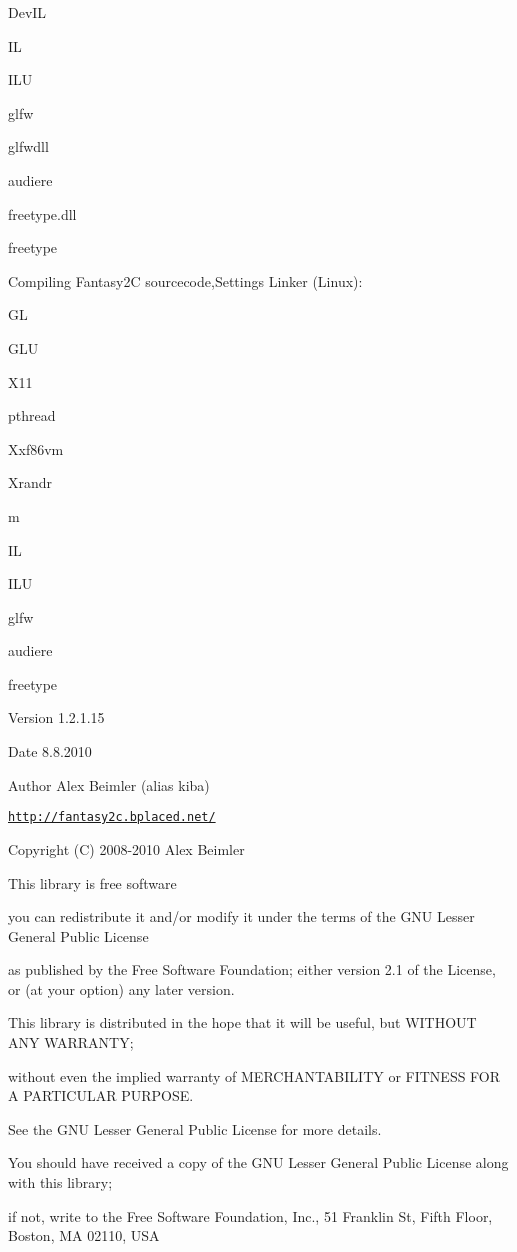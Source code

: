  DevIL \par
 IL \par
 ILU \par
 glfw \par
 glfwdll \par
 audiere \par
 freetype.dll \par
 freetype \par
 \par
 Compiling Fantasy2C sourcecode,Settings Linker (Linux): \par
 GL \par
 GLU \par
 X11 \par
 pthread \par
 Xxf86vm \par
 Xrandr \par
 m \par
 IL \par
 ILU \par
 glfw \par
 audiere \par
 freetype \par
 \par
 \begin{DoxyVersion}{Version}
1.2.1.15 
\end{DoxyVersion}
\begin{DoxyDate}{Date}
8.8.2010 
\end{DoxyDate}
\begin{DoxyAuthor}{Author}
Alex Beimler (alias kiba) \par
 \href{http://fantasy2c.bplaced.net/}{\tt http://fantasy2c.bplaced.net/} \par
 \par
 Copyright (C) 2008-\/2010 Alex Beimler \par
 \par
 This library is free software \par
 you can redistribute it and/or modify it under the terms of the GNU Lesser General Public License \par
 as published by the Free Software Foundation; either version 2.1 of the License, or (at your option) any later version. \par
 This library is distributed in the hope that it will be useful, but WITHOUT ANY WARRANTY; \par
 without even the implied warranty of MERCHANTABILITY or FITNESS FOR A PARTICULAR PURPOSE. \par
 See the GNU Lesser General Public License for more details. \par
 \par
 You should have received a copy of the GNU Lesser General Public License along with this library; \par
 if not, write to the Free Software Foundation, Inc., 51 Franklin St, Fifth Floor, Boston, MA 02110, USA \par
 
\end{DoxyAuthor}
